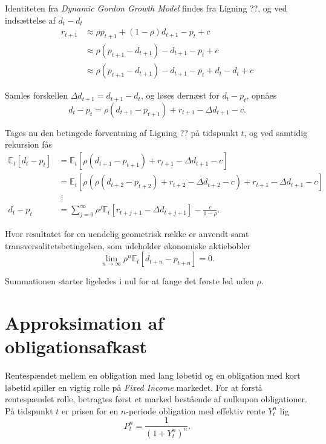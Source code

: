 \documentclass[
  a4paper,
  oneside]{memoir}
\begin{document}
Identiteten fra \emph{Dynamic Gordon Growth Model} findes fra Ligning ??, og ved indsættelse af \(d_t-d_t\)
\begin{align}
r_{t+1}&\approx \rho p_{t+1} + (1-\rho) d_{t+1} - p_t + c\\
&\approx \rho(p_{t+1}-d_{t+1})-d_{t+1}-p_t+c\\
&\approx \rho(p_{t+1}-d_{t+1})-d_{t+1}-p_t+d_t-d_t+c
\end{align}

Samles forskellen \(\Delta d_{t+1}=d_{t+1}-d_t\), og løses dernæst for \(d_t-p_t\), opnåes
\begin{equation}
d_t-p_t=\rho (d_{t+1}-p_{t+1})+r_{t+1}-\Delta d_{t+1}-c.
\end{equation}

Tages nu den betingede forventning af Ligning ?? på tidspunkt \(t\), og ved samtidig rekursion fås
\begin{align}
\mathbb{E}_t[d_t-p_t]&=\mathbb{E}_t[\rho(d_{t+1}-p_{t+1}) + r_{t+1} -\Delta d_{t+1}-c]\\
&=\mathbb{E}_t[\rho(\rho(d_{t+2}-p_{t+2}) + r_{t+2} -\Delta d_{t+2}-c) + r_{t+1} -\Delta d_{t+1} - c]\\
&\,\,\vdots\\
d_t-p_t&=\sum_{j=0}^\infty \rho^j \mathbb{E}_t[r_{t+j+1}-\Delta d_{t+j+1}] - \frac{c}{1-\rho}.
\end{align}

Hvor resultatet for en uendelig geometrisk række er anvendt samt transversalitetsbetingelsen, som udeholder økonomiske aktiebobler
\[\lim_{n\to\infty} \rho^n \mathbb{E}_t[d_{t+n} - p_{t+n}]=0.\]

Summationen starter ligeledes i nul for at fange det første led uden \(\rho\).

\hypertarget{approksimation-af-obligationsafkast}{%
\section{Approksimation af obligationsafkast}\label{approksimation-af-obligationsafkast}}

Rentespændet mellem en obligation med lang løbetid og en obligation med kort løbetid spiller en vigtig rolle på \emph{Fixed Income} markedet. For at forstå rentespændet rolle, betragtes først et marked bestående af nulkupon obligationer. På tidspunkt \(t\) er prisen for en \(n\)-periode obligation med effektiv rente \(Y_t^n\) lig
\begin{equation}
P_t^n=\frac{1}{(1+Y_t^n)^n}.
\end{equation}
\end{document}
